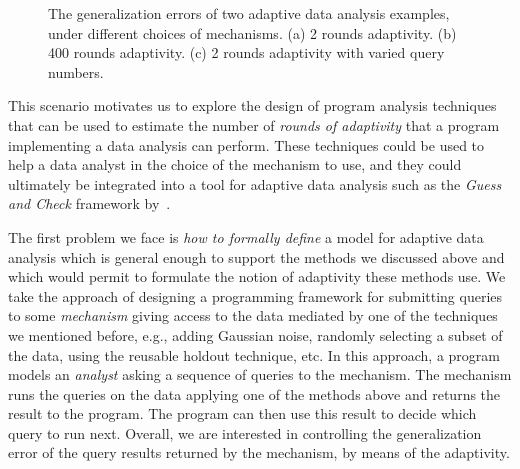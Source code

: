 {\begin{figure}
\begin{subfigure}{.322\textwidth}
\begin{centering}
\caption{}
\end{centering}
\end{subfigure}
\vspace{-0.2cm}
 \caption{
 The generalization errors of two adaptive data analysis examples, under different choices of mechanisms.
 (a)  2 rounds adaptivity. 
 (b)  400 rounds adaptivity.
 (c) 2 rounds adaptivity with varied query numbers.
}
\label{fig:generalization_errors}
\vspace{-0.2cm}
\end{figure}
}

This scenario motivates us to explore the design of program analysis techniques that can be used to estimate the number of \emph{rounds of adaptivity} that a program implementing a data analysis can perform. These techniques could be used to help a data analyst in the choice of the mechanism to use,
and they
could ultimately be integrated into a tool for adaptive data analysis such as the \emph{Guess and Check} framework by~\citet{RogersRSSTW20}. 

The first problem we face is \emph{how to formally define} a model for adaptive data analysis which is general enough to support the methods we discussed above and which would permit to formulate the notion of adaptivity these methods use. We take the approach of designing a programming framework for submitting queries to some \emph{mechanism} giving access to the data mediated by one of the techniques we mentioned before, e.g., adding Gaussian noise, randomly selecting a subset of the data, using the reusable holdout technique, etc. In this approach, a program models an \emph{analyst} asking a sequence of queries to the mechanism. The mechanism runs the queries on the data applying one of the methods above and returns the result to the program. The program can then use this result to decide which query to run next. Overall, we are interested in controlling the generalization error of the query results returned by the mechanism, by means of the adaptivity. 

